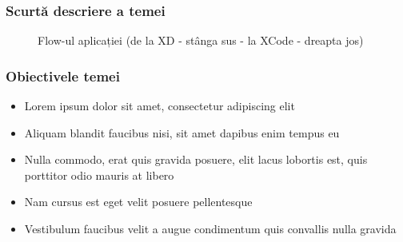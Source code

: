 \documentclass{beamer}
\begin{document}

\begin{frame}
\frametitle{Scurtă descriere a temei}
\begin{figure}[!htbp]
\centering
{}
\caption{Flow-ul aplicației (de la XD - stânga sus - la XCode - dreapta jos)} \label{fig:Prezentare}
\end{figure}
\end{frame}

\begin{frame}
\frametitle{Obiectivele temei}
\begin{itemize}
\item Lorem ipsum dolor sit amet, consectetur adipiscing elit
\item Aliquam blandit faucibus nisi, sit amet dapibus enim tempus eu
\item Nulla commodo, erat quis gravida posuere, elit lacus lobortis est, quis porttitor odio mauris at libero
\item Nam cursus est eget velit posuere pellentesque
\item Vestibulum faucibus velit a augue condimentum quis convallis nulla gravida
\end{itemize}
\end{frame}
\end{document}
